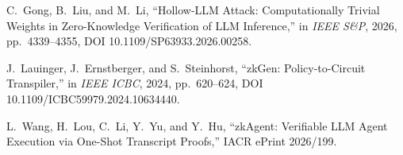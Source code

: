 \documentclass[journal]{IEEEtran}
\newcommand{\need}[1]{}
\newcommand{\need}[1]{\textcolor{blue}{[[ NEED: #1 ]]}}
\begin{document}
\need{\textbf{待补}：把 Theorem \ref{thm:t1}(H) 的随机预言机模型换成
标准模型（或明确声明本文只在 ROM 下主张）。当前证明依赖 $H$ 是新鲜随机函数
这一条；实践中的 SHA-256 只给计算意义下的近似，故正文措辞必须写成
\emph{heuristic}，不得写成信息论界。}

\begin{thebibliography}{99}

C.~Gong, B.~Liu, and M.~Li, ``Hollow-LLM Attack: Computationally Trivial
Weights in Zero-Knowledge Verification of LLM Inference,'' in \emph{IEEE S\&P},
2026, pp.~4339--4355, DOI 10.1109/SP63933.2026.00258.

\need{zk-attach, arXiv:2608.30083 --- 打开原文核实作者后再引}

J.~Lauinger, J.~Ernstberger, and S.~Steinhorst, ``zkGen: Policy-to-Circuit
Transpiler,'' in \emph{IEEE ICBC}, 2024, pp.~620--624,
DOI 10.1109/ICBC59979.2024.10634440.

\need{PCO, IACR ePrint 2026/994 --- 打开原文核实作者（Dolev/Yung 等）后再引}

L.~Wang, H.~Lou, C.~Li, Y.~Yu, and Y.~Hu, ``zkAgent: Verifiable LLM Agent
Execution via One-Shot Transcript Proofs,'' IACR ePrint 2026/199.

\need{Verifiable Document Redacting, Springer, DOI 10.1007/978-3-319-66402-6_20
--- 核实作者与年份。\textbf{绝不能再引 IACR ePrint 2024/813}（那是
Kiraz/Larraia/Vaughan, "How to Redact the Bitcoin Backbone Protocol"）。
见 docs/tdsc-fixlist.md \S A。}

\end{thebibliography}
\end{document}

